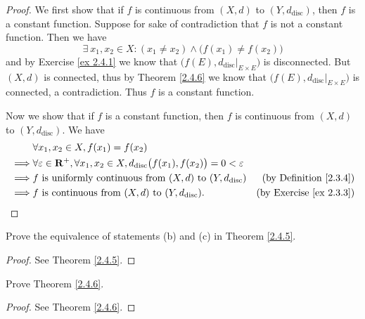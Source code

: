 \begin{proof}
    We first show that if \(f\) is continuous from \((X, d)\) to \((Y, d_{\text{disc}})\), then \(f\) is a constant function.
    Suppose for sake of contradiction that \(f\) is not a constant function.
    Then we have
    \[
        \exists\ x_1, x_2 \in X : (x_1 \neq x_2) \land \big(f(x_1) \neq f(x_2)\big)
    \]
    and by Exercise \ref{ex 2.4.1} we know that \(\big(f(E), d_{\text{disc}}|_{E \times E}\big)\) is disconnected.
    But \((X, d)\) is connected, thus by Theorem \ref{2.4.6} we know that \(\big(f(E), d_{\text{disc}}|_{E \times E}\big)\) is connected, a contradiction.
    Thus \(f\) is a constant function.

    Now we show that if \(f\) is a constant function, then \(f\) is continuous from \((X, d)\) to \((Y, d_{\text{disc}})\).
    We have
    \begin{align*}
                 & \forall x_1, x_2 \in X, f(x_1) = f(x_2)                                                                                                                       \\
        \implies & \forall \varepsilon \in \mathbf{R}^+, \forall x_1, x_2 \in X, d_{\text{disc}}\big(f(x_1), f(x_2)\big) = 0 < \varepsilon                                       \\
        \implies & f \text{ is uniformly continuous from } (X, d) \text{ to } (Y, d_{\text{disc}})                                         & \text{(by Definition \ref{2.3.4})}  \\
        \implies & f \text{ is continuous from } (X, d) \text{ to } (Y, d_{\text{disc}}).                                                  & \text{(by Exercise \ref{ex 2.3.3})}
    \end{align*}
\end{proof}

\begin{exercise}\label{ex 2.4.3}
    Prove the equivalence of statements (b) and (c) in Theorem \ref{2.4.5}.
\end{exercise}

\begin{proof}
    See Theorem \ref{2.4.5}.
\end{proof}

\begin{exercise}\label{ex 2.4.4}
    Prove Theorem \ref{2.4.6}.
\end{exercise}

\begin{proof}
    See Theorem \ref{2.4.6}.
\end{proof}

